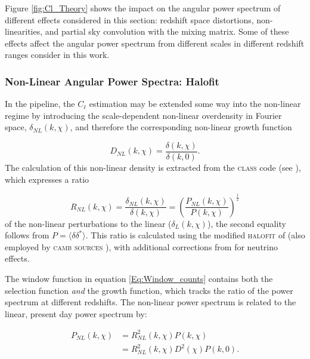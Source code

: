 \qquad Figure \ref{fig:Cl_Theory} shows the impact on the angular power spectrum of different effects considered in this section: redshift space distortions, non-linearities, and partial sky convolution with the mixing matrix. Some of these effects affect the angular power spectrum from different scales in different redshift ranges consider in this work.

\subsubsection{Non-Linear Angular Power Spectra: Halofit}\label{Sec:NonLin}
In the \uclcl pipeline, the $C_{\ell}$ estimation may be extended some way into the non-linear regime by introducing the scale-dependent non-linear overdensity in Fourier space, $\delta_{NL}(k,\chi)$, and therefore the corresponding non-linear growth function 

\begin{equation}
D_{NL}(k,\chi) = \frac{\delta(k,\chi)}{\delta(k,0)}.
\end{equation}
The calculation of this non-linear density is extracted from the \textsc{class} code (see \cite{Class,CLASSgal}), which expresses a ratio

\begin{equation}
R_{NL}(k,\chi) = \frac{\delta_{NL}(k,\chi)}{\delta(k,\chi)} = \left( \frac{P_{NL}(k,\chi)}{P(k,\chi)} \right)^{\frac{1}{2}}
\end{equation}
of the non-linear perturbations to the linear ($\delta_L(k,\chi)$), the second equality follows from $P = \langle \delta \delta^* \rangle$. This ratio is calculated using the modified \textsc{halofit} of \cite{2012-Halofit} (also employed by \textsc{camb sources} \citep{CambSources}), with additional corrections from \cite{Bird2012} for neutrino effects. 

\qquad The window function in equation \ref{Eq:Window_counts} contains both the selection function \emph{and} the growth function, which tracks the ratio of the power spectrum at different redshifts. The non-linear power spectrum is related to the linear, present day power spectrum by:

\begin{equation}
\begin{split}
P_{NL}(k,\chi) & = R^2_{NL}(k,\chi) P(k,\chi) \\
& = R^2_{NL}(k,\chi) D^2(\chi) P(k,0).
\end{split}\end{equation}

